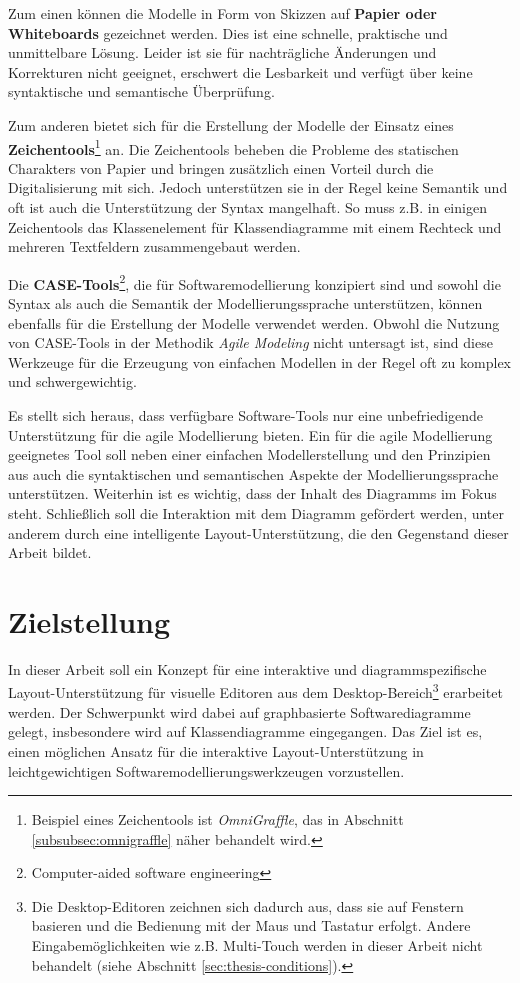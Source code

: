 Zum einen können die Modelle in Form von Skizzen auf \textbf{Papier oder Whiteboards} gezeichnet werden. Dies ist eine schnelle, praktische und unmittelbare Lösung. Leider ist sie für nachträgliche Änderungen und Korrekturen nicht geeignet, erschwert die Lesbarkeit und verfügt über keine syntaktische und semantische Überprüfung.

Zum anderen bietet sich für die Erstellung der Modelle der Einsatz eines \textbf{Zeichentools}\footnote{Beispiel eines Zeichentools ist \textit{OmniGraffle}, das in Abschnitt \ref{subsubsec:omnigraffle} näher behandelt wird.} an. Die Zeichentools beheben die Probleme des statischen Charakters von Papier und bringen zusätzlich einen Vorteil durch die Digitalisierung mit sich. Jedoch unterstützen sie in der Regel keine Semantik und oft ist auch die Unterstützung der Syntax mangelhaft. So muss z.B. in einigen Zeichentools das Klassenelement für Klassendiagramme mit einem Rechteck und mehreren Textfeldern zusammengebaut werden.

Die \textbf{CASE-Tools}\footnote{Computer-aided software engineering}, die für Softwaremodellierung konzipiert sind und sowohl die Syntax als auch die Semantik der Modellierungssprache unterstützen, können ebenfalls für die Erstellung der Modelle verwendet werden. Obwohl die Nutzung von CASE-Tools in der Methodik \textit{Agile Modeling} nicht untersagt ist, sind diese Werkzeuge für die Erzeugung von einfachen Modellen in der Regel oft zu komplex und schwergewichtig.

Es stellt sich heraus, dass verfügbare Software-Tools nur eine unbefriedigende Unterstützung für die agile Modellierung bieten. Ein für die agile Modellierung geeignetes Tool soll neben einer einfachen Modellerstellung und den Prinzipien aus \cite{Ambler02Agile} auch die syntaktischen und semantischen Aspekte der Modellierungssprache unterstützen. Weiterhin ist es wichtig, dass der Inhalt des Diagramms im Fokus steht. Schließlich soll die Interaktion mit dem Diagramm gefördert werden, unter anderem durch eine intelligente Layout-Unterstützung, die den Gegenstand dieser Arbeit bildet.

\section{Zielstellung}

In dieser Arbeit soll ein Konzept für eine interaktive und diagrammspezifische Layout-Un\-ter\-stüt\-zung für visuelle Editoren aus dem Desktop-Bereich\footnote{Die Desktop-Editoren zeichnen sich dadurch aus, dass sie auf Fenstern basieren und die Bedienung mit der Maus und Tastatur erfolgt. Andere Eingabemöglichkeiten wie z.B. Multi-Touch werden in dieser Arbeit nicht behandelt (siehe Abschnitt \ref{sec:thesis-conditions}).} erarbeitet werden. Der Schwerpunkt wird dabei auf graphbasierte Softwarediagramme gelegt, insbesondere wird auf Klassendiagramme eingegangen. Das Ziel ist es, einen möglichen Ansatz für die interaktive Layout-Unterstützung in leichtgewichtigen Softwaremodellierungswerkzeugen vorzustellen.

